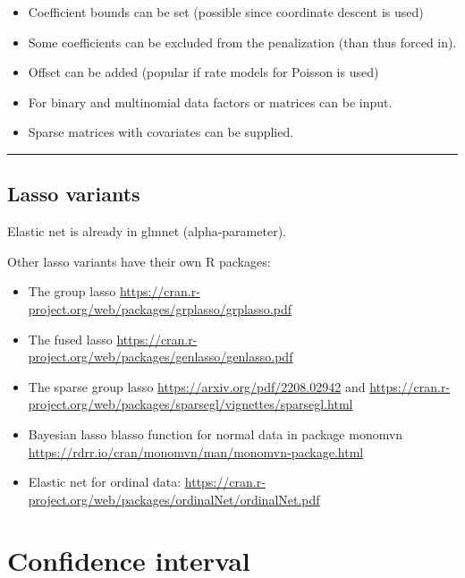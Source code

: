 \documentclass[
  letterpaper,
  DIV=11,
  numbers=noendperiod]{scrartcl}
\providecommand{\tightlist}{%
  \setlength{\itemsep}{0pt}\setlength{\parskip}{0pt}}\usepackage{longtable,booktabs,array}
\begin{document}
\begin{itemize}
\tightlist
\item
  Coefficient bounds can be set (possible since coordinate descent is
  used)
\item
  Some coefficients can be excluded from the penalization (than thus
  forced in).
\item
  Offset can be added (popular if rate models for Poisson is used)
\item
  For binary and multinomial data factors or matrices can be input.
\item
  Sparse matrices with covariates can be supplied.
\end{itemize}

\begin{center}\rule{0.5\linewidth}{0.5pt}\end{center}

\hypertarget{lasso-variants}{%
\subsection{Lasso variants}\label{lasso-variants}}

Elastic net is already in glmnet (alpha-parameter).

Other lasso variants have their own R packages:

\begin{itemize}
\item
  The group lasso
  \url{https://cran.r-project.org/web/packages/grplasso/grplasso.pdf}
\item
  The fused lasso
  \url{https://cran.r-project.org/web/packages/genlasso/genlasso.pdf}
\item
  The sparse group lasso \url{https://arxiv.org/pdf/2208.02942} and
  \url{https://cran.r-project.org/web/packages/sparsegl/vignettes/sparsegl.html}
\item
  Bayesian lasso blasso function for normal data in package monomvn
  \url{https://rdrr.io/cran/monomvn/man/monomvn-package.html}
\item
  Elastic net for ordinal data:
  \url{https://cran.r-project.org/web/packages/ordinalNet/ordinalNet.pdf}
\end{itemize}

\hypertarget{confidence-interval}{%
\section{Confidence interval}\label{confidence-interval}}
\end{document}
